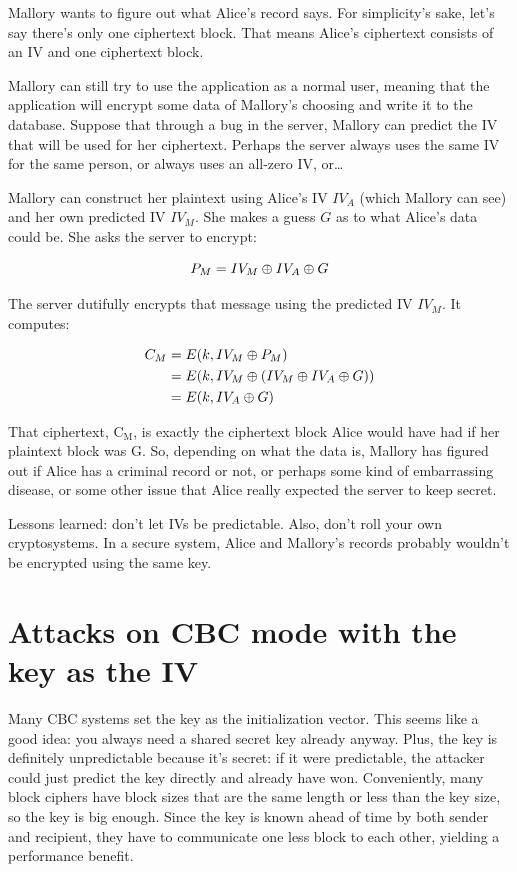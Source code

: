 \documentclass[11pt,ebook,table,dvipsnames]{memoir}
\begin{document}
Mallory wants to figure out what Alice's record says. For simplicity's
sake, let's say there's only one ciphertext block. That means Alice's
ciphertext consists of an IV and one ciphertext block.

Mallory can still try to use the application as a normal user, meaning
that the application will encrypt some data of Mallory's choosing and
write it to the database. Suppose that through a bug in the server,
Mallory can predict the IV that will be used for her ciphertext.
Perhaps the server always uses the same IV for the same person, or
always uses an all-zero IV, or\ldots{}

Mallory can construct her plaintext using Alice's IV $IV_A$ (which
Mallory can see) and her own predicted IV $IV_M$. She makes a guess
$G$ as to what Alice's data could be. She asks the server to encrypt:

\[
P_M = IV_M \oplus IV_A \oplus G
\]

The server dutifully encrypts that message using the predicted IV
$IV_M$. It computes:

\begin{align*}
C_M & = E(k, IV_M \oplus P_M) \\
    & = E(k, IV_M \oplus (IV_M \oplus IV_A \oplus G)) \\
    & = E(k, IV_A \oplus G)
\end{align*}

That ciphertext, C$_{\text{M}}$, is exactly the ciphertext block Alice would have
had if her plaintext block was G. So, depending on what the data is,
Mallory has figured out if Alice has a criminal record or not, or
perhaps some kind of embarrassing disease, or some other issue that
Alice really expected the server to keep secret.

Lessons learned: don't let IVs be predictable. Also, don't roll your
own cryptosystems. In a secure system, Alice and Mallory's records
probably wouldn't be encrypted using the same key.
\section{\label{Attacks-on-CBC-mode-with-the-key-as-the-IV}Attacks on CBC mode with the key as the IV}
\label{sec-2-3-6}

Many CBC systems set the key as the initialization vector. This seems
like a good idea: you always need a shared secret key already anyway.
Plus, the key is definitely unpredictable because it's secret: if it
were predictable, the attacker could just predict the key directly and
already have won. Conveniently, many block ciphers have block sizes
that are the same length or less than the key size, so the key is
big enough. Since the key is known ahead of time by both sender and
recipient, they have to communicate one less block to each other,
yielding a performance benefit.
\end{document}
